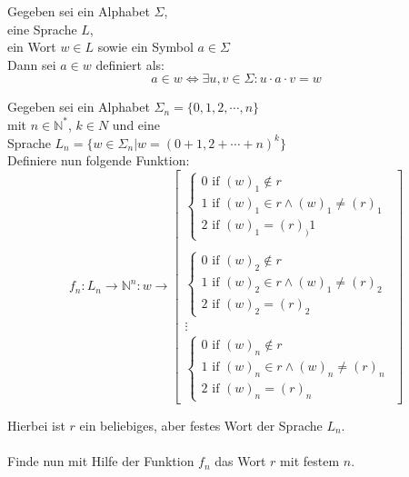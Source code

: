 \documentclass{paper}
\begin{document}
	\begin{center}


		\begin{tcolorbox}[enhanced, fit to height=4cm, text width=7cm, colframe=black!75!black, title= Definition]
			Gegeben sei ein Alphabet $\Sigma$, \\
			eine Sprache $L$, \\
			ein Wort $w \in L$ sowie ein Symbol $a \in \Sigma$ \\
			Dann sei $a \in w$ definiert als: \\
			\[a \in w \Leftrightarrow \exists u, v \in \Sigma: u \cdot a \cdot v = w \]
		\end{tcolorbox}
	\end{center}
	\bigskip
	\bigskip
	Gegeben sei ein Alphabet $\Sigma_n = \{0, 1, 2, \cdots, n\}$\\ 
	mit $n \in \mathbb{N}^*$, $k \in N$ und eine \\ 
	Sprache $L_n = \{w \in \Sigma_n | w = (0 + 1, 2 + \cdots + n)^k\}$ \\ 
	Definiere nun folgende Funktion:\\
	\[
	f_n: L_n \rightarrow \mathbb{N}^n: w \rightarrow \begin{bmatrix}
										\begin{cases}
											0 \text{ if } (w)_1 \not\in r \\
											1 \text{ if } (w)_1 \in r \land (w)_1 \not = (r)_1 \\
											2 \text{ if } (w)_1 = (r)_)1
										\end{cases} \\ \\
										\begin{cases}
											0 \text{ if } (w)_2 \not\in r \\
											1 \text{ if } (w)_2 \in r \land (w)_1 \not = (r)_2 \\
											2 \text{ if } (w)_2 = (r)_2
										\end{cases} \\ 
										\vdots \\ 
										\begin{cases}
											0 \text{ if } (w)_n \not\in r \\
											1 \text{ if } (w)_n \in r \land (w)_n \not = (r)_n \\
											2 \text{ if } (w)_n = (r)_n
										\end{cases}
									\end{bmatrix}
	\]

Hierbei ist $r$ ein beliebiges, aber festes Wort der Sprache $L_n$. \\ \\
Finde nun mit Hilfe der Funktion $f_n$ das Wort $r$ mit festem $n$.
\end{document}
